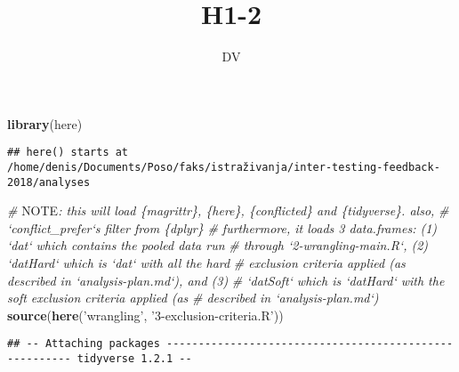 \documentclass[12pt,]{article}
\title{H1-2}
\author{DV}
\date{}
\newenvironment{Shaded}{\begin{snugshade}}{\end{snugshade}}
\newcommand{\AlertTok}[1]{\textcolor[rgb]{0.94,0.16,0.16}{#1}}
\newcommand{\CommentTok}[1]{\textcolor[rgb]{0.56,0.35,0.01}{\textit{#1}}}
\newcommand{\DataTypeTok}[1]{\textcolor[rgb]{0.13,0.29,0.53}{#1}}
\newcommand{\DecValTok}[1]{\textcolor[rgb]{0.00,0.00,0.81}{#1}}
\newcommand{\KeywordTok}[1]{\textcolor[rgb]{0.13,0.29,0.53}{\textbf{#1}}}
\newcommand{\NormalTok}[1]{#1}
\newcommand{\OperatorTok}[1]{\textcolor[rgb]{0.81,0.36,0.00}{\textbf{#1}}}
\newcommand{\StringTok}[1]{\textcolor[rgb]{0.31,0.60,0.02}{#1}}
\begin{document}
\maketitle

{
\setcounter{tocdepth}{4}
\tableofcontents
}
\begin{Shaded}
\end{Shaded}

\begin{Shaded}
\begin{Highlighting}[]
\KeywordTok{library}\NormalTok{(here)}
\end{Highlighting}
\end{Shaded}

\begin{verbatim}
## here() starts at /home/denis/Documents/Poso/faks/istraživanja/inter-testing-feedback-2018/analyses
\end{verbatim}

\begin{Shaded}
\begin{Highlighting}[]
\CommentTok{# }\AlertTok{NOTE}\CommentTok{: this will load \{magrittr\}, \{here\}, \{conflicted\} and \{tidyverse\}. also,}
\CommentTok{# `conflict_prefer`s filter from \{dplyr\}}
\CommentTok{# furthermore, it loads 3 data.frames: (1) `dat` which contains the pooled data run}
\CommentTok{# through `2-wrangling-main.R`, (2) `datHard` which is `dat` with all the hard}
\CommentTok{# exclusion criteria applied (as described in `analysis-plan.md`), and (3)}
\CommentTok{# `datSoft` which is `datHard` with the soft exclusion criteria applied (as}
\CommentTok{# described in `analysis-plan.md`)}
\KeywordTok{source}\NormalTok{(}\KeywordTok{here}\NormalTok{(}\StringTok{'wrangling'}\NormalTok{, }\StringTok{'3-exclusion-criteria.R'}\NormalTok{))}
\end{Highlighting}
\end{Shaded}

\begin{verbatim}
## -- Attaching packages ------------------------------------------------------- tidyverse 1.2.1 --
\end{verbatim}
\end{document}
